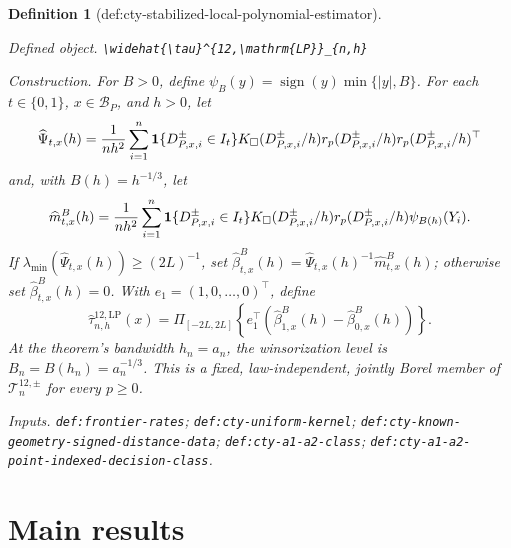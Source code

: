 \documentclass{article}
\newtheorem{definition}{Definition}
\begin{document}
\begin{definition}[def:cty-stabilized-local-polynomial-estimator]\label{def:cty-stabilized-local-polynomial-estimator}
\par\smallskip\noindent\emph{Defined object.} \texttt{\textbackslash{}\allowbreak{}widehat\{\textbackslash{}\allowbreak{}tau\}\allowbreak{}\textasciicircum{}\{12,\allowbreak{}\textbackslash{}\allowbreak{}mathrm\{LP\}\allowbreak{}\}\allowbreak{}\_\allowbreak{}\{n,\allowbreak{}h\}\allowbreak{}}
\par\smallskip\noindent\emph{Construction.} For \(B>0\), define \(\psi_B(y)=\operatorname{sign}(y)\min\{|y|,B\}\).  For each \(t\in\{0,1\}\), \(x\in\mathcal B_P\), and \(h>0\), let
\[
 \widehat\Psi_{t,x}(h)={1\over nh^2}\sum_{i=1}^n
 \mathbf 1\{D^{\pm}_{P,x,i}\in I_t\}K_\square(D^{\pm}_{P,x,i}/h)
 r_p(D^{\pm}_{P,x,i}/h)r_p(D^{\pm}_{P,x,i}/h)^\top
\]
and, with \(B(h)=h^{-1/3}\), let
\[
 \widehat m^B_{t,x}(h)={1\over nh^2}\sum_{i=1}^n
 \mathbf 1\{D^{\pm}_{P,x,i}\in I_t\}K_\square(D^{\pm}_{P,x,i}/h)
 r_p(D^{\pm}_{P,x,i}/h)\psi_{B(h)}(Y_i).
\]
If \(\lambda_{\min}(\widehat\Psi_{t,x}(h))\geq(2L)^{-1}\), set \(\widehat\beta^B_{t,x}(h)=\widehat\Psi_{t,x}(h)^{-1}\widehat m^B_{t,x}(h)\); otherwise set \(\widehat\beta^B_{t,x}(h)=0\).  With \(e_1=(1,0,\ldots,0)^\top\), define
\[
 \widehat\tau^{12,\mathrm{LP}}_{n,h}(x)=
 \Pi_{[-2L,2L]}\!\left\{e_1^\top(\widehat\beta^B_{1,x}(h)-\widehat\beta^B_{0,x}(h))\right\}.
\]
At the theorem's bandwidth \(h_n=a_n\), the winsorization level is \(B_n=B(h_n)=a_n^{-1/3}\).  This is a fixed, law-independent, jointly Borel member of \(\mathcal T^{12,\pm}_n\) for every \(p\geq0\).
\par\smallskip\noindent\emph{Inputs.} \texttt{def:\allowbreak{}frontier-\allowbreak{}rates}; \texttt{def:\allowbreak{}cty-\allowbreak{}uniform-\allowbreak{}kernel}; \texttt{def:\allowbreak{}cty-\allowbreak{}known-\allowbreak{}geometry-\allowbreak{}signed-\allowbreak{}distance-\allowbreak{}data}; \texttt{def:\allowbreak{}cty-\allowbreak{}a1-\allowbreak{}a2-\allowbreak{}class}; \texttt{def:\allowbreak{}cty-\allowbreak{}a1-\allowbreak{}a2-\allowbreak{}point-\allowbreak{}indexed-\allowbreak{}decision-\allowbreak{}class}.
\end{definition}

\section{Main results}
\end{document}
